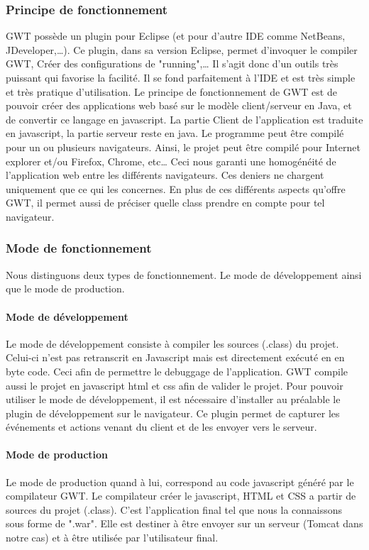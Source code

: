 \subsubsection{Principe de fonctionnement}
GWT possède un plugin pour Eclipse (et pour d'autre IDE comme NetBeans, JDeveloper,…). Ce plugin, dans sa version Eclipse, permet d'invoquer le compiler GWT, Créer des configurations de "running",… Il s'agit donc d'un outils très puissant qui favorise la facilité. Il se fond parfaitement à l'IDE et est très simple et très pratique d'utilisation.
Le principe de fonctionnement de GWT est de pouvoir créer des applications web basé sur le modèle client/serveur en Java, et de convertir ce langage en javascript. La partie Client de l'application est traduite en javascript, la partie serveur reste en java. Le programme peut être compilé pour un ou plusieurs navigateurs. Ainsi, le projet peut être compilé pour Internet explorer et/ou Firefox, Chrome, etc… Ceci nous garanti une homogénéité de l'application web entre les différents navigateurs. Ces deniers ne chargent uniquement que ce qui les concernes. En plus de ces différents aspects qu'offre GWT, il permet aussi de préciser quelle class prendre en compte pour tel navigateur.

\subsubsection{Mode de fonctionnement}
Nous distinguons deux types de fonctionnement. Le mode de développement ainsi que le mode de production.
	
\paragraph{Mode de développement}
Le mode de développement consiste à compiler les sources (.class) du projet. Celui-ci n'est pas retranscrit en Javascript mais est directement exécuté en en byte code. Ceci afin de permettre le debuggage de l'application. GWT compile aussi le projet en javascript html et css afin de valider le projet.
Pour pouvoir utiliser le mode de développement, il est nécessaire d'installer au préalable le plugin de développement sur le navigateur. Ce plugin permet de capturer les événements et actions venant du client et de les envoyer vers le serveur.
\paragraph{Mode de production}
Le mode de production quand à lui, correspond au code javascript généré par le compilateur GWT. Le compilateur créer le javascript, HTML et CSS a partir de sources du projet (.class). C'est l'application final tel que nous la connaissons sous forme de ".war". Elle est destiner à être envoyer sur un serveur (Tomcat dans notre cas) et à être utilisée par l'utilisateur final.

